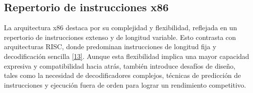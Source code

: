 \documentclass[12pt,oneside]{templates/unerthesis}
\begin{document}
\begin{table}[!h]
\centering
\caption{\label{tab:evolucionx86}Línea de Tiempo de la Evolución de la Arquitectura x86}
\centering
{}
\end{table}

\hypertarget{repertorio-de-instrucciones-x86}{%
\subsection{Repertorio de instrucciones x86}\label{repertorio-de-instrucciones-x86}}

La arquitectura x86 destaca por su complejidad y flexibilidad, reflejada en un repertorio de instrucciones extenso y de longitud variable. Esto contrasta con arquitecturas RISC, donde predominan instrucciones de longitud fija y decodificación sencilla \protect\hyperlink{ref-hennessy2017computer}{{[}13{]}}. Aunque esta flexibilidad implica una mayor capacidad expresiva y compatibilidad hacia atrás, también introduce desafíos de diseño, tales como la necesidad de decodificadores complejos, técnicas de predicción de instrucciones y ejecución fuera de orden para lograr un rendimiento competitivo.
\end{document}
